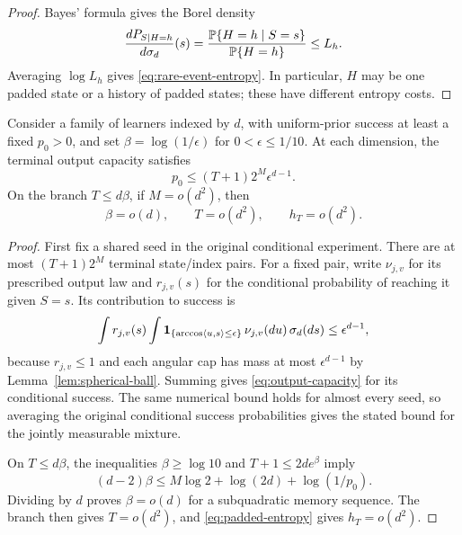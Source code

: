 \begin{proof}
Bayes' formula gives the Borel density
\[
 \frac{dP_{S\mid H=h}}{d\sigma_d}(s)
 =\frac{\mathbb P\{H=h\mid S=s\}}{\mathbb P\{H=h\}}\le L_h.
\]
Averaging $\log L_h$ gives \eqref{eq:rare-event-entropy}. In particular,
$H$ may be one padded state or a history of padded states; these have
different entropy costs.
\end{proof}

\begin{lemma}\label{lem:early-clock}
Consider a family of learners indexed by $d$, with uniform-prior success
at least a fixed $p_0>0$, and set
$\beta=\log(1/\epsilon)$ for $0<\epsilon\le1/10$.
At each dimension, the terminal output capacity satisfies
\begin{equation}\label{eq:output-capacity}
 p_0\le (T+1)2^M\epsilon^{d-1}.
\end{equation}
On the branch $T\le d\beta$, if $M=o(d^2)$, then
\begin{equation}\label{eq:early-clock}
 \beta=o(d),\qquad T=o(d^2),\qquad h_T=o(d^2).
\end{equation}
\end{lemma}

\begin{proof}
First fix a shared seed in the original conditional experiment.
There are at most $(T+1)2^M$ terminal state/index pairs. For a fixed pair,
write $\nu_{j,v}$ for its prescribed output law and
$r_{j,v}(s)$ for the conditional probability of reaching it given $S=s$.
Its contribution to success is
\[
 \int r_{j,v}(s)\int
 \mathbf 1_{\{\arccos\langle u,s\rangle\le\epsilon\}}
 \,\nu_{j,v}(du)\,\sigma_d(ds)
 \le\epsilon^{d-1},
\]
because $r_{j,v}\le1$ and each angular cap has mass at most
$\epsilon^{d-1}$ by Lemma~\ref{lem:spherical-ball}.
Summing gives \eqref{eq:output-capacity} for its
conditional success. The same numerical bound holds for almost every seed,
so averaging the original conditional success probabilities gives the
stated bound for the jointly measurable mixture.

On $T\le d\beta$, the inequalities $\beta\ge\log10$ and
$T+1\le2d e^\beta$ imply
\[
 (d-2)\beta\le M\log2+\log(2d)+\log(1/p_0).
\]
Dividing by $d$ proves $\beta=o(d)$ for a subquadratic memory sequence.
The branch then gives $T=o(d^2)$, and \eqref{eq:padded-entropy} gives
$h_T=o(d^2)$.
\end{proof}

